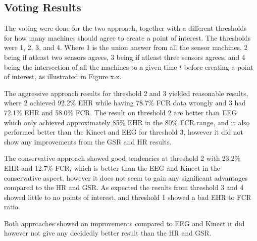 \subsection{Voting Results}
The voting were done for the two approach, together with a different thresholds for how many machines should agree to create a point of interest.
The thresholds were 1, 2, 3, and 4. Where 1 is the union answer from all the sensor machines, 2 being if atleast two sensors agrees, 3 being if atleast three sensors agrees, and 4 being the intersection of all the machines to a given time $t$ before creating a point of interest, as illustrated in Figure x.x.

The aggressive approach results for threshold 2 and 3 yielded reasonable results, where 2 achieved 92.2\% EHR while having 78.7\% FCR data wrongly and 3 had 72.1\% EHR and 58.0\% FCR. The result on threshold 2 are better than EEG which only achieved approximately 85\% EHR in the 80\% FCR range, and it also performed better than the Kinect and EEG for threshold 3, however it did not show any improvements from the GSR and HR results.

The conservative approach showed good tendencies at threshold 2 with 23.2\% EHR and 12.7\% FCR, which is better than the EEG and Kinect in the conservative aspect, however it does not seem to gain any significant advantages compared to the HR and GSR.
As expected the results from threshold 3 and 4 showed little to no points of interest, and threshold 1 showed a bad EHR to FCR ratio. 

Both approaches showed an improvements compared to EEG and Kinect it did however not give any decidedly better result than the HR and GSR. 

